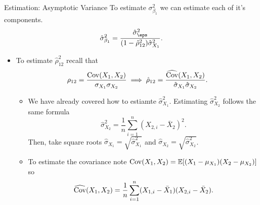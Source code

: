 \documentclass[notheorems,9pt]{beamer}
\begin{document}
\begin{frame}{Estimation: Asymptotic Variance} 
	\label{frame:estimation2}
	To estimate \(\sigma_{\beta_1}^2\) we can estimate each of it's components.
	\[
		\hat\sigma_{\beta_1}^2 = \frac{\hat\sigma_\eps^2}{(1-\hat\rho_{12}^2)\hat\sigma_{X_1}^2} 
	.\]
	\begin{itemize}
		\item To estimate \(\hat\rho_{12}^2\) recall that 
		 \[
			 \rho_{12} = \frac{\operatorname{Cov}(X_1,X_2)}{\sigma_{X_1}\sigma_{X_2}}\implies \hat\rho_{12} = \frac{\widehat{\operatorname{Cov}}(X_1,X_2)}{\hat\sigma_{X_1}\hat\sigma_{X_2}}  
		.\]
		\begin{itemize}
			\item<2-> We have already covered how to estiamte \(\hat\sigma_{X_1}^2\). Estimating  \(\hat\sigma_{X_2}^2\) follows the same formula
			 \[
				 \hat\sigma_{X_2}^2 = \frac{1}{n}\sum_{i=1}^n (X_{2,i} - \bar X_2)^2
			.\]
			Then, take square roots \(\hat\sigma_{X_1} = \sqrt{\hat\sigma_{X_1}^2}\) and \(\hat\sigma_{X_2} =\sqrt{\hat\sigma_{X_2}^2}\).
			\item<3-> To estimate the covariance note \(\operatorname{Cov}(X_1,X_2) = \mathbb{E}[(X_1 - \mu_{X_1})(X_2 - \mu_{X_2})]\) so 
			\[
				\widehat{\operatorname{Cov}}(X_1,X_2) = \frac{1}{n}\sum_{i=1}^n (X_{1,i} - \bar X_1)(X_{2,i} - \bar X_2)
			.\] 
		\end{itemize}
	\end{itemize}
\end{frame}

\end{document}
